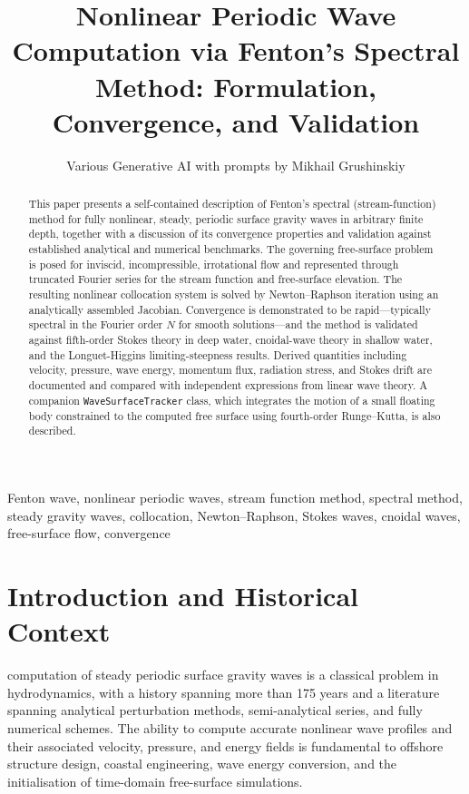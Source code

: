 \documentclass[journal,10pt,twocolumn]{IEEEtran}
\title{Nonlinear Periodic Wave Computation via Fenton's Spectral Method:
       Formulation, Convergence, and Validation}
\author{Various Generative AI with prompts by Mikhail Grushinskiy}
\begin{document}
\maketitle

\begin{abstract}
This paper presents a self-contained description of Fenton's spectral
(stream-function) method for fully nonlinear, steady, periodic surface
gravity waves in arbitrary finite depth, together with a discussion of
its convergence properties and validation against established analytical
and numerical benchmarks.
The governing free-surface problem is posed for inviscid,
incompressible, irrotational flow and represented through truncated
Fourier series for the stream function and free-surface elevation.
The resulting nonlinear collocation system is solved by
Newton--Raphson iteration using an analytically assembled Jacobian.
Convergence is demonstrated to be rapid---typically spectral in the
Fourier order $N$ for smooth solutions---and the method is validated
against fifth-order Stokes theory in deep water, cnoidal-wave theory in
shallow water, and the Longuet-Higgins limiting-steepness results.
Derived quantities including velocity, pressure, wave energy, momentum
flux, radiation stress, and Stokes drift are documented and compared
with independent expressions from linear wave theory.
A companion \texttt{WaveSurfaceTracker} class, which integrates the
motion of a small floating body constrained to the computed free
surface using fourth-order Runge--Kutta, is also described.
\end{abstract}


\begin{IEEEkeywords}
Fenton wave, nonlinear periodic waves, stream function method,
spectral method, steady gravity waves, collocation, Newton--Raphson,
Stokes waves, cnoidal waves, free-surface flow, convergence
\end{IEEEkeywords}

\section{Introduction and Historical Context}
\label{sec:intro}

 computation of steady periodic surface gravity
waves is a classical problem in hydrodynamics, with a history spanning
more than 175 years and a literature spanning analytical perturbation
methods, semi-analytical series, and fully numerical schemes.
The ability to compute accurate nonlinear wave profiles and their
associated velocity, pressure, and energy fields is fundamental to
offshore structure design, coastal engineering, wave energy conversion,
and the initialisation of time-domain free-surface simulations.
\end{document}
